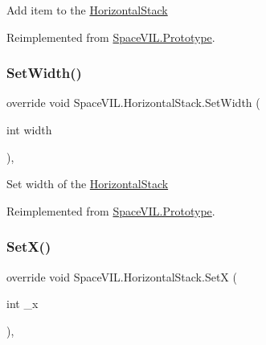 Add item to the \mbox{\hyperlink{class_space_v_i_l_1_1_horizontal_stack}{Horizontal\+Stack}} 



Reimplemented from \mbox{\hyperlink{class_space_v_i_l_1_1_prototype}{Space\+V\+I\+L.\+Prototype}}.

\mbox{\label{class_space_v_i_l_1_1_horizontal_stack_aa0650cd4cc25c1471f7b31748a6fd7e1}} 
\subsubsection{\texorpdfstring{Set\+Width()}{SetWidth()}}
{\footnotesize\ttfamily override void Space\+V\+I\+L.\+Horizontal\+Stack.\+Set\+Width (\begin{DoxyParamCaption}\item[{int}]{width }\end{DoxyParamCaption})\hspace{0.3cm}{\ttfamily [inline]}, {\ttfamily [virtual]}}



Set width of the \mbox{\hyperlink{class_space_v_i_l_1_1_horizontal_stack}{Horizontal\+Stack}} 



Reimplemented from \mbox{\hyperlink{class_space_v_i_l_1_1_prototype_a6a4f1b9581f4d18f1c3a3e287d4b2a2b}{Space\+V\+I\+L.\+Prototype}}.

\mbox{\label{class_space_v_i_l_1_1_horizontal_stack_abfcfb03003ed514e6262ae9004688477}} 
\subsubsection{\texorpdfstring{Set\+X()}{SetX()}}
{\footnotesize\ttfamily override void Space\+V\+I\+L.\+Horizontal\+Stack.\+SetX (\begin{DoxyParamCaption}\item[{int}]{\+\_\+x }\end{DoxyParamCaption})\hspace{0.3cm}{\ttfamily [inline]}, {\ttfamily [virtual]}}



